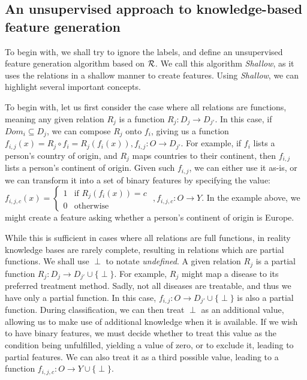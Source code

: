 \documentclass[twoside,11pt]{article}
\theoremstyle{definition}
\begin{document}
\subsection{An unsupervised approach to knowledge-based feature generation} \label{shallow_section}

To begin with, we shall try to ignore the labels, and define an unsupervised feature generation algorithm based on ${\cal R}$. We call this algorithm \emph{Shallow}, as it uses the relations in a shallow manner to create features. Using \emph{Shallow}, we can highlight several important concepts.

To begin with, let us first consider the case where all relations are functions, meaning any given relation $R_j$ is a function $R_j:D_j\rightarrow D_{j'}$. In this case, if $Dom_i \subseteq D_j$, we can compose $R_j$ onto $f_i$, giving us a function $f_{i,j}(x)=R_j\circ f_i=R_j(f_i(x)),f_{i,j}:O\rightarrow D_{j'}$. For example, if $f_i$ lists a person's country of origin, and $R_j$ maps countries to their continent, then $f_{i,j}$ lists a person's continent of origin.
Given such $f_{i,j}$, we can either use it as-is, or we can transform it into a set of binary features by specifying the value: $f_{i,j,c}(x)=\begin{cases} 1 &\mbox{if } R_j(f_i(x))=c\\ 
0 & \mbox{otherwise } \end{cases}$ $,f_{i,j,c}:O\rightarrow Y$. In the example above, we might create a feature asking whether a person's continent of origin is Europe.

While this is sufficient in cases where all relations are full functions, in reality knowledge bases are rarely complete, resulting in relations which are partial functions. We shall use $\perp$ to notate \emph{undefined}. A given relation $R_j$ is a partial function $R_j:D_j\rightarrow D_{j'}\cup\{\perp\}$. For example, $R_j$ might map a disease to its preferred treatment method. Sadly, not all diseases are treatable, and thus we have only a partial function.
In this case, $f_{i,j}:O\rightarrow D_{j'}\cup\{\perp\}$ is also a partial function.
During classification, we can then treat $\perp$ as an additional value, allowing us to make use of additional knowledge when it is available. If we wish to have binary features, we must decide whether to treat this value as the condition being unfulfilled, yielding a value of zero, or to exclude it, leading to partial features. We can also treat it as a third possible value, leading to a function $f_{i,j,c}:O\rightarrow Y\cup\{\perp\}$.
\end{document}
